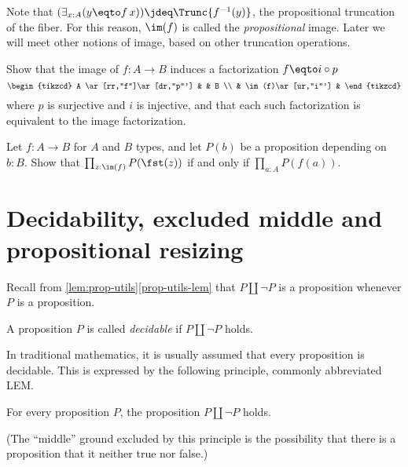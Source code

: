 Note that $(\exists_{x:A}(y \eqto f\,x)) \jdeq \Trunc{f^{-1}(y)}$,
the propositional truncation of the fiber.
For this reason, $\im(f)$ is called the \emph{propositional} image.
Later we will meet other notions of image, based on other truncation operations.

\begin{xca}\label{xca:unique-fact-image}
  Show that the image of $f : A \to B$ induces a factorization $f \eqto i\circ p$
  \[
    \begin{tikzcd}
      A \ar[rr,"f"]\ar[dr,"p"'] & & B \\
      & \im(f)\ar[ur,"i"'] &
    \end{tikzcd}
  \]
  where $p$ is surjective and $i$ is injective, and that each such factorization
  is equivalent to the image factorization.
\end{xca}

\begin{xca}\label{xca:all-prop-image}
Let $f:A\to B$ for $A$ and $B$ types, and let $P(b)$ be a proposition
depending on $b:B$.
Show that $\prod_{z:\im(f)} P(\fst(z))$ if and only if $\prod_{a:A} P(f(a))$.
\end{xca}



\section{Decidability, excluded middle and propositional resizing}
\label{sec:decidability}

Recall from \cref{lem:prop-utils}\ref{prop-utils-lem} that $P\amalg \neg P$ is a proposition whenever $P$ is a proposition.
\begin{definition}\label{def:decidability}
  A proposition $P$ is called \emph{decidable}
  if $P\amalg\neg P$ holds.
\end{definition}
In traditional mathematics, it is usually assumed that
every proposition is decidable.
This is expressed by the following principle, commonly abbreviated LEM.
\begin{principle}
  \label{pri:lem}%
  For every proposition $P$, the proposition $P \amalg \neg P$ holds.
\end{principle}

(The ``middle'' ground excluded by this principle is the possibility that there
is a proposition that it neither true nor false.)

